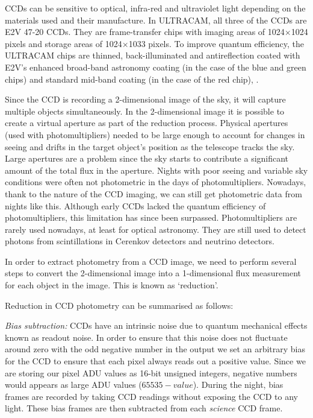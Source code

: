 CCDs can be sensitive to optical, infra-red and ultraviolet light depending on the materials used and their manufacture. In ULTRACAM, all three of the CCDs are E2V 47-20 CCDs. They are frame-transfer chips with imaging areas of 1024$\times$1024 pixels and storage areas of 1024$\times$1033 pixels.  To improve quantum efficiency, the ULTRACAM chips are thinned, back-illuminated and antireflection coated with E2V's enhanced broad-band astronomy coating (in the case of the blue and green chips) and standard mid-band coating (in the case of the red chip), \citep{dhillon07}.

Since the CCD is recording a 2-dimensional image of the sky, it will capture multiple objects simultaneously. In the 2-dimensional image it is possible to create a virtual aperture as part of the reduction process. Physical apertures (used with photomultipliers) needed to be large enough to account for changes in seeing and drifts in the target object's position as the telescope tracks the sky. Large apertures are a problem since the sky starts to contribute a significant amount of the total flux in the aperture. Nights with poor seeing and variable sky conditions were often not photometric in the days of photomultipliers. Nowadays, thank to the nature of the CCD imaging, we can still get photometric data from nights like this.  Although early CCDs lacked the quantum efficiency of photomultipliers, this limitation has since been surpassed. Photomultipliers are rarely used nowadays, at least for optical astronomy. They are still used to detect photons from scintillations in Cerenkov detectors and neutrino detectors.  

In order to extract photometry from a CCD image, we need to perform several steps to convert the 2-dimensional image into a 1-dimensional flux measurement for each object in the image. This is known as `reduction'. 

Reduction in CCD photometry can be summarised as follows: 

\emph{Bias subtraction:}
CCDs have an intrinsic noise due to quantum mechanical effects known as readout noise. In order to ensure that this noise does not fluctuate around zero with the odd negative number in the output we set an arbitrary bias for the CCD to ensure that each pixel always reads out a positive value. Since we are storing our pixel ADU values as 16-bit unsigned integers, negative numbers would appears as large ADU values ($65535 - value$). During the night, bias frames are recorded by taking CCD readings without exposing the CCD to any light. These bias frames are then subtracted from each \emph{science} CCD frame. 

